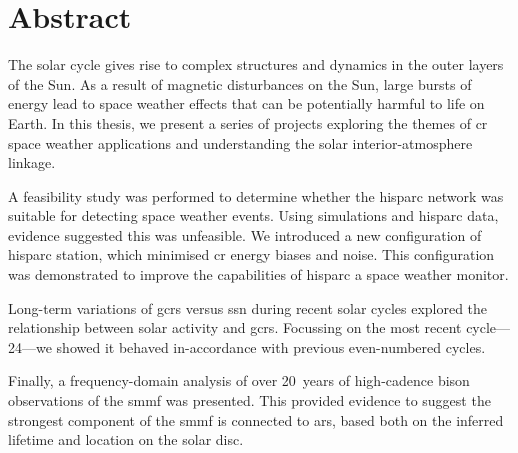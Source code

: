 \chapter*{Abstract}

The solar cycle gives rise to complex structures and dynamics in the outer layers of the Sun. As a result of magnetic disturbances on the Sun, large bursts of energy lead to space weather effects that can be potentially harmful to life on Earth. In this thesis, we present a series of projects exploring the themes of \gls{cr} space weather applications and understanding the solar interior-atmosphere linkage. 

A feasibility study was performed to determine whether the \gls{hisparc} network was suitable for detecting space weather events. Using simulations and \gls{hisparc} data, evidence suggested this was unfeasible. We introduced a new configuration of \gls{hisparc} station, which minimised \gls{cr} energy biases and noise. This configuration was demonstrated to improve the capabilities of \gls{hisparc} a space weather monitor.

Long-term variations of \glspl{gcr} versus \gls{ssn} during recent solar cycles explored the relationship between solar activity and \glspl{gcr}. Focussing on the most recent cycle---24---we showed it behaved in-accordance with previous even-numbered cycles.


Finally, a frequency-domain analysis of over 20~years of high-cadence \gls{bison} observations of the \gls{smmf} was presented. This provided evidence to suggest the strongest component of the \gls{smmf} is connected to \glspl{ar}, based both on the inferred lifetime and location on the solar disc.